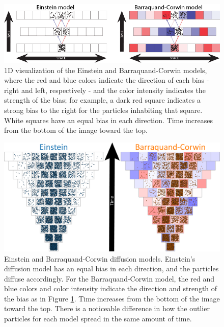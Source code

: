 \begin{figure}[hb]
\begin{center}
\includegraphics[width=0.9\columnwidth]{Figures/model_both_sidebyside.png}
\caption{\label{fig:1D_BC} 1D visualization of the Einstein and Barraquand-Corwin models, where the red and blue colors indicate the direction of each bias - right and left, respectively - and the color intensity indicates the strength of the bias; for example, a dark red square indicates a strong bias to the right for the particles inhabiting that square. White squares have an equal bias in each direction. Time increases from the bottom of the image toward the top.}
\end{center}
\end{figure}

\begin{figure}[htp]
\begin{center}
\includegraphics[width=0.9\columnwidth]{Figures/TriangleGrowth-01.png}
\caption{\label{fig:comparison} Einstein and Barraquand-Corwin diffusion models. Einstein's diffusion model has an equal bias in each direction, and the particles diffuse accordingly. For the Barraquand-Corwin model, the red and blue colors and color intensity indicate the direction and strength of the bias as in Figure \ref{fig:1D_BC}. Time increases from the bottom of the image toward the top. There is a noticeable difference in how the outlier particles for each model spread in the same amount of time.}
\end{center}
\end{figure}

